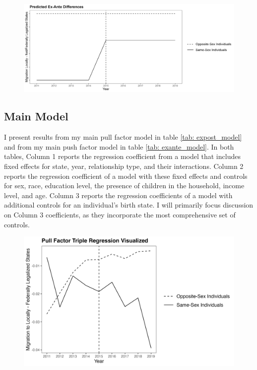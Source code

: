 \documentclass[12pt,letterpaper]{article}
\begin{document}
\begin{figure}[htbp]
    \centering
    \includegraphics[width=0.75\linewidth]{outputs/summary_stats/ex_ante_diffs.png}
    \caption{}
    \label{fig: ex_ante_diffs}
\end{figure}


\clearpage
\subsection{Main Model} %
I present results from my main pull factor model in table \ref{tab: expost_model} and from my main push factor model in table \ref{tab: exante_model}. In both tables, Column 1 reports the regression coefficient from a model that includes fixed effects for state, year, relationship type, and their interactions. Column 2 reports the regression coefficient of a model with these fixed effects and controls for sex, race, education level, the presence of children in the household, income level, and age. Column 3 reports the regression coefficients of a model with additional controls for an individual’s birth state. I will primarily focus discussion on Column 3 coefficients, as they incorporate the most comprehensive set of controls.

\begin{figure}[htbp]
    \centering
    \includegraphics[width=0.75\linewidth]{outputs/summary_stats/post_diffs.png}
    \caption{}
    \label{fig: post_diffs}
\end{figure}
\end{document}
